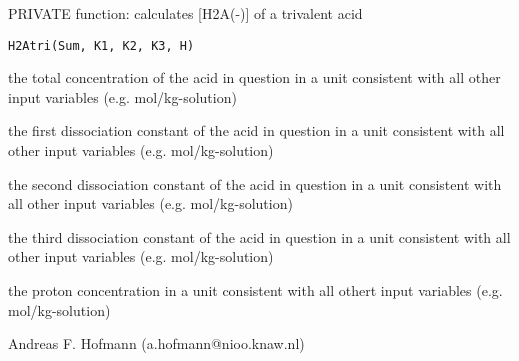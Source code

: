 \documentclass{article}
\begin{document}
\begin{Description}\relax
PRIVATE function: calculates [H2A(-)] of a trivalent acid
\end{Description}
\begin{Usage}
\begin{verbatim}H2Atri(Sum, K1, K2, K3, H)\end{verbatim}
\end{Usage}
\begin{Arguments}
\begin{ldescription}
\item[\code{Sum }] the total concentration of the acid in question in a unit consistent with all other input variables (e.g. mol/kg-solution)
\item[\code{K1 }] the first dissociation constant of the acid in question in a unit consistent with all other input variables (e.g. mol/kg-solution)
\item[\code{K2 }] the second dissociation constant of the acid in question in a unit consistent with all other input variables (e.g. mol/kg-solution)
\item[\code{K3 }] the third dissociation constant of the acid in question in a unit consistent with all other input variables (e.g. mol/kg-solution)
\item[\code{H }] the proton concentration in a unit consistent with all othert input variables (e.g. mol/kg-solution)
\end{ldescription}
\end{Arguments}
\begin{Author}\relax
Andreas F. Hofmann (a.hofmann@nioo.knaw.nl)
\end{Author}
\end{document}
